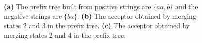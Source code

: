 \documentclass[twoside,11pt]{article}
\newcommand{\tbf}[1]{\textbf{#1}}
\begin{document}
\begin{figure}
\begin{subfigure}[b]{0.32\textwidth}
{
        }
        \caption{}
        \label{fig:nd}
    \end{subfigure}
    \caption{
        \tbf{(a)} The prefix tree built from positive strings are $\{aa,b\}$ and the negative strings are $\{ba\}$.
        \tbf{(b)} The acceptor obtained by merging states 2 and 3 in the prefix tree.
        \tbf{(c)} The acceptor obtained by merging states 2 and 4 in the prefix tree.
    }
\end{figure}





\end{document}
